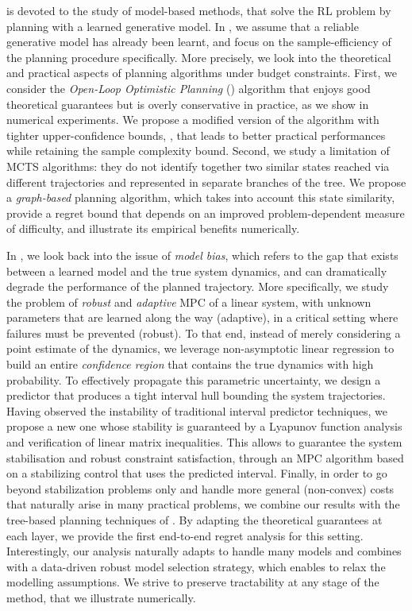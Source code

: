  is devoted to the study of model-based methods, that solve the \acl*{RL} problem by planning with a learned generative model.
In , we assume that a reliable generative model has already been learnt, and focus on the sample-efficiency of the planning procedure specifically. More precisely, we look into the theoretical and practical aspects of planning algorithms under budget constraints. First, we consider the \emph{Open-Loop Optimistic Planning} (\OLOP) algorithm that enjoys good theoretical guarantees but is overly conservative in practice, as we show in numerical experiments. We propose a modified version of the algorithm with tighter upper-confidence bounds, \KLOLOP, that leads to better practical performances while retaining the sample complexity bound. Second, we study a limitation of \ac*{MCTS} algorithms: they do not identify together two similar states reached via different trajectories and represented in separate branches of the tree. We propose a \emph{graph-based} planning algorithm, which takes into account this state similarity, provide a regret bound that depends on an improved problem-dependent measure of difficulty, and illustrate its empirical benefits numerically.

In , we look back into the issue of \emph{model bias}, which refers to the gap that exists between a learned model and the true system dynamics, and can dramatically degrade the performance of the planned trajectory. More specifically, we study the problem of \emph{robust} and \emph{adaptive} \ac{MPC} of a linear system, with unknown parameters that are learned along the way (adaptive), in a critical setting where failures must be prevented (robust).
To that end, instead of merely considering a point estimate of the dynamics, we leverage non-asymptotic linear regression to build an entire \emph{confidence region} that contains the true dynamics with high probability.
To effectively propagate this parametric uncertainty, we design a predictor that produces a tight interval hull bounding the system trajectories. Having observed the instability of traditional interval predictor techniques, we propose a new one whose stability is guaranteed by a Lyapunov function analysis and verification of linear matrix inequalities.
This allows to guarantee the system stabilisation and robust constraint satisfaction, through an \ac*{MPC} algorithm based on a stabilizing control that uses the predicted interval.
Finally, in order to go beyond stabilization problems only and handle more general (non-convex) costs that naturally arise in many practical problems, we combine our results with the tree-based planning techniques of . By adapting the theoretical guarantees at each layer, we provide the first end-to-end regret analysis for this setting. Interestingly, our analysis naturally adapts to handle many models and combines with a data-driven robust model selection strategy, which enables to relax the modelling assumptions. We strive to preserve tractability at any stage of the method, that we illustrate numerically.

